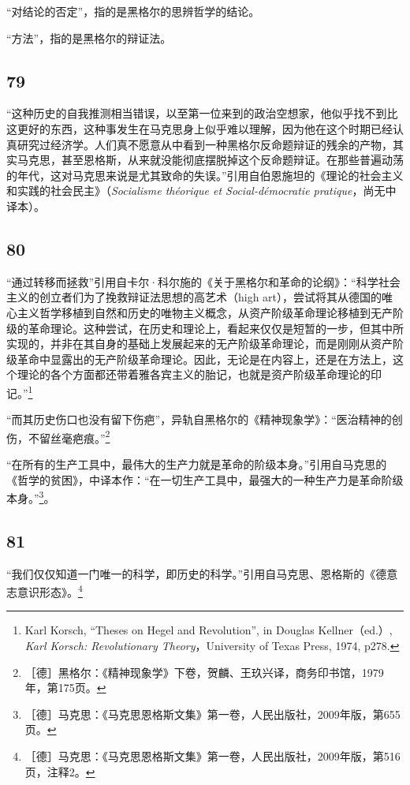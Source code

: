 \documentclass[fontset=fandol, a4paper, 12pt, openright]{ctexbook}
\begin{document}
“对结论的否定”，指的是黑格尔的思辨哲学的结论。

“方法”，指的是黑格尔的辩证法。

\subsection*{79}
“这种历史的自我推测相当错误，以至第一位来到的政治空想家，他似乎找不到比这更好的东西，这种事发生在马克思身上似乎难以理解，因为他在这个时期已经认真研究过经济学。人们真不愿意从中看到一种黑格尔反命题辩证的残余的产物，其实马克思，甚至恩格斯，从来就没能彻底摆脱掉这个反命题辩证。在那些普遍动荡的年代，这对马克思来说是尤其致命的失误。”引用自伯恩施坦的《理论的社会主义和实践的社会民主》（\textit{Socialisme théorique et Social-démocratie pratique}，尚无中译本）。

\subsection*{80}
“通过转移而拯救”引用自卡尔·科尔施的《关于黑格尔和革命的论纲》：“科学社会主义的创立者们为了挽救辩证法思想的高艺术（high art），尝试将其从德国的唯心主义哲学移植到自然和历史的唯物主义概念，从资产阶级革命理论移植到无产阶级的革命理论。这种尝试，在历史和理论上，看起来仅仅是短暂的一步，但其中所实现的，并非在其自身的基础上发展起来的无产阶级革命理论，而是刚刚从资产阶级革命中显露出的无产阶级革命理论。因此，无论是在内容上，还是在方法上，这个理论的各个方面都还带着雅各宾主义的胎记，也就是资产阶级革命理论的印记。”\footnote{Karl Korsch, “Theses on Hegel and Revolution”, in Douglas Kellner（ed.）, \textit{Karl Korsch: Revolutionary Theory}，University of Texas Press, 1974, p278.}

“而其历史伤口也没有留下伤疤”，异轨自黑格尔的《精神现象学》：“医治精神的创伤，不留丝毫疤痕。”\footnote{［德］黑格尔：《精神现象学》下卷，贺麟、王玖兴译，商务印书馆，1979年，第175页。}

“在所有的生产工具中，最伟大的生产力就是革命的阶级本身。”引用自马克思的《哲学的贫困》，中译本作：“在一切生产工具中，最强大的一种生产力是革命阶级本身。”\footnote{［德］马克思：《马克思恩格斯文集》第一卷，人民出版社，2009年版，第655页。}。

\subsection*{81}
“我们仅仅知道一门唯一的科学，即历史的科学。”引用自马克思、恩格斯的《德意志意识形态》。\footnote{［德］马克思：《马克思恩格斯文集》第一卷，人民出版社，2009年版，第516页，注释2。}
\end{document}
